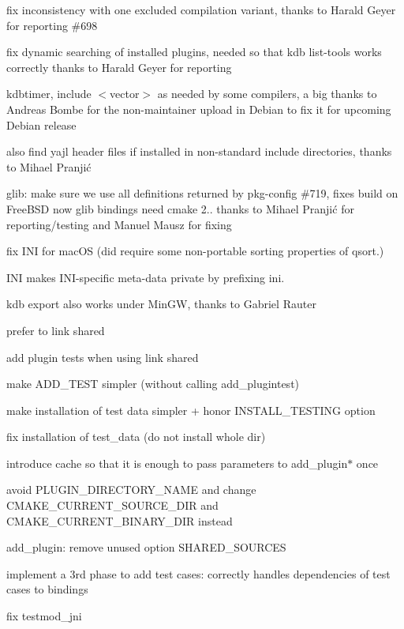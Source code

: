 \begin{DoxyItemize}
\item fix inconsistency with one excluded compilation variant, thanks to Harald Geyer for reporting \#698
\item fix dynamic searching of installed plugins, needed so that kdb list-\/tools works correctly thanks to Harald Geyer for reporting
\item kdbtimer, {\ttfamily include $<$vector$>$} as needed by some compilers, a big thanks to Andreas Bombe for the non-\/maintainer upload in Debian to fix it for upcoming Debian release
\item also find yajl header files if installed in non-\/standard include directories, thanks to Mihael Pranjić
\item glib\+: make sure we use all definitions returned by pkg-\/config \#719, fixes build on Free\+B\+SD now glib bindings need cmake 2.. thanks to Mihael Pranjić for reporting/testing and Manuel Mausz for fixing
\item fix I\+NI for mac\+OS (did require some non-\/portable sorting properties of {\ttfamily qsort}.)
\item I\+NI makes I\+N\+I-\/specific meta-\/data private by prefixing {\ttfamily ini}.
\item {\ttfamily kdb export} also works under Min\+GW, thanks to Gabriel Rauter
\end{DoxyItemize}


\begin{DoxyItemize}
\item prefer to link shared
\item add plugin tests when using link shared
\item make A\+D\+D\+\_\+\+T\+E\+ST simpler (without calling add\+\_\+plugintest)
\item make installation of test data simpler + honor I\+N\+S\+T\+A\+L\+L\+\_\+\+T\+E\+S\+T\+I\+NG option
\item fix installation of test\+\_\+data (do not install whole dir)
\item introduce cache so that it is enough to pass parameters to {\ttfamily add\+\_\+plugin$\ast$} once
\item avoid P\+L\+U\+G\+I\+N\+\_\+\+D\+I\+R\+E\+C\+T\+O\+R\+Y\+\_\+\+N\+A\+ME and change C\+M\+A\+K\+E\+\_\+\+C\+U\+R\+R\+E\+N\+T\+\_\+\+S\+O\+U\+R\+C\+E\+\_\+\+D\+IR and C\+M\+A\+K\+E\+\_\+\+C\+U\+R\+R\+E\+N\+T\+\_\+\+B\+I\+N\+A\+R\+Y\+\_\+\+D\+IR instead
\item add\+\_\+plugin\+: remove unused option S\+H\+A\+R\+E\+D\+\_\+\+S\+O\+U\+R\+C\+ES
\item implement a 3rd phase to add test cases\+: correctly handles dependencies of test cases to bindings
\item fix testmod\+\_\+jni
\end{DoxyItemize}

